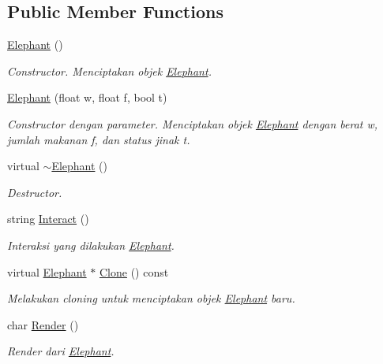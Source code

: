 \subsection*{Public Member Functions}
\begin{DoxyCompactItemize}
\item 
\hyperlink{classElephant_a372cc81064310f2f96db175b747647cb}{Elephant} ()
\begin{DoxyCompactList}\small\item\em Constructor. Menciptakan objek \hyperlink{classElephant}{Elephant}. \end{DoxyCompactList}\item 
\hyperlink{classElephant_a76bf83d1aacd5ff494532e14cf2a3bee}{Elephant} (float w, float f, bool t)
\begin{DoxyCompactList}\small\item\em Constructor dengan parameter. Menciptakan objek \hyperlink{classElephant}{Elephant} dengan berat w, jumlah makanan f, dan status jinak t. \end{DoxyCompactList}\item 
virtual \hyperlink{classElephant_aed5fb7142a24a101330af52652909075}{$\sim$\+Elephant} ()
\begin{DoxyCompactList}\small\item\em Destructor. \end{DoxyCompactList}\item 
string \hyperlink{classElephant_a4f2c4bef5ec886019ee88ad575f94fa7}{Interact} ()
\begin{DoxyCompactList}\small\item\em Interaksi yang dilakukan \hyperlink{classElephant}{Elephant}. \end{DoxyCompactList}\item 
virtual \hyperlink{classElephant}{Elephant} $\ast$ \hyperlink{classElephant_a723a7c90f44a95d9886163e605aecea7}{Clone} () const 
\begin{DoxyCompactList}\small\item\em Melakukan cloning untuk menciptakan objek \hyperlink{classElephant}{Elephant} baru. \end{DoxyCompactList}\item 
char \hyperlink{classElephant_a7e412f36e1f88cd278dea76d4f383e95}{Render} ()
\begin{DoxyCompactList}\small\item\em Render dari \hyperlink{classElephant}{Elephant}. \end{DoxyCompactList}\end{DoxyCompactItemize}
